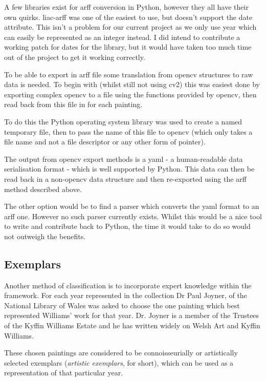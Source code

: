 A few libraries exist for \gls{arff} conversion in Python, however they all have their own quirks. 
liac-arff was one of the easiest to use, but doesn't support the date attribute. This isn't
a problem for our current project as we only use year which can easily be represented as an 
integer instead. I did intend to contribute a working patch for dates for the library, but it 
would have taken too much time out of the project to get it working correctly.

To be able to export in \gls{arff} file some translation from \gls{opencv} structures to raw data is 
needed. To begin with (whilst still not using \gls{cv2}) this was easiest done by exporting 
complex \gls{opencv} to a file using the functions provided by \gls{opencv}, then read back from
this file in for each painting.

To do this the Python operating system library was used to create a named temporary file, then to
pass the name of this file to \gls{opencv} (which only takes a file name and not a file descriptor
or any other form of pointer). 

The output from \gls{opencv} export methods is a \gls{yaml} - a human-readable data serialisation
format - which is well supported by Python. This data can then be read back in a non-\gls{opencv}
data structure and then re-exported using the \gls{arff} method described above.

The other option would be to find a parser which converts the \gls{yaml} format to an \gls{arff} 
one. However no such parser currently exists. Whilst this would be a nice tool to write and
contribute back to Python, the time it would take to do so would not outweigh the benefits.


\subsection{Exemplars}
Another method of classification is to incorporate expert knowledge within the framework. For each
year represented in the collection Dr Paul Joyner, of the National Library of Wales was asked to
choose the one painting which best represented Williams' work for that year. Dr. Joyner is a 
member of the Trustees of the Kyffin Williams Estate and he has written widely on Welsh Art and
Kyffin Williams.

These chosen paintings are considered to be connoisseurially or artistically selected exemplars
(\emph{artistic exemplars}, for short), which can be used as a representation of that particular
year.


